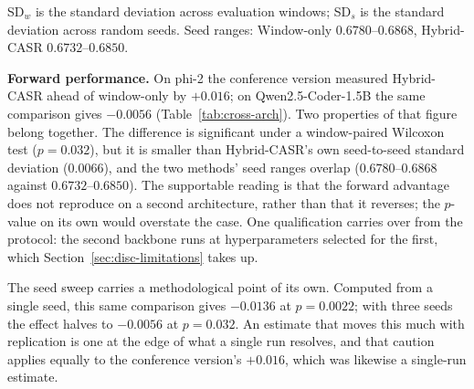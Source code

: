 \documentclass[a4paper,twoside]{article}
\begin{document}
\begin{table}[t]
  \centering
  \caption{Forward F1 across backbones. $\Delta$ and $p$ are paired Wilcoxon signed-rank tests against the window-only baseline \emph{on the same backbone}, over the 41 common windows, after averaging across seeds.}
  \label{tab:cross-arch}
  \vspace{1mm}
  {\footnotesize SD$_w$ is the standard deviation across evaluation windows; SD$_s$ is the standard deviation across random seeds. Seed ranges: Window-only $0.6780$--$0.6868$, Hybrid-CASR $0.6732$--$0.6850$.}
\end{table}

\textbf{Forward performance.} On phi-2 the conference version measured Hybrid-CASR ahead of window-only by $+0.016$; on Qwen2.5-Coder-1.5B the same comparison gives $-0.0056$ (Table~\ref{tab:cross-arch}). Two properties of that figure belong together. The difference is significant under a window-paired Wilcoxon test ($p=0.032$), but it is smaller than Hybrid-CASR's own seed-to-seed standard deviation ($0.0066$), and the two methods' seed ranges overlap ($0.6780$--$0.6868$ against $0.6732$--$0.6850$). The supportable reading is that the forward advantage does not reproduce on a second architecture, rather than that it reverses; the $p$-value on its own would overstate the case. One qualification carries over from the protocol: the second backbone runs at hyperparameters selected for the first, which Section~\ref{sec:disc-limitations} takes up.

The seed sweep carries a methodological point of its own. Computed from a single seed, this same comparison gives $-0.0136$ at $p=0.0022$; with three seeds the effect halves to $-0.0056$ at $p=0.032$. An estimate that moves this much with replication is one at the edge of what a single run resolves, and that caution applies equally to the conference version's $+0.016$, which was likewise a single-run estimate.
\end{document}
